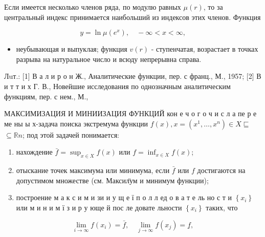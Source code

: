 \documentclass[10pt]{article}
\begin{document}
Если имеется несколько членов ряда, по модулю равных $\mu(r)$, то за центральный индекс принимается наибольший из индексов этих членов. Функция



\[

y=\ln \mu\left(e^{x}\right), \quad-\infty<x<\infty,

\]



\begin{itemize}

  \item неубывающая и выпуклая; функция $v(r)$ - ступенчатая, возрастает в точках разрыва на натуральное число и всюду непрерывна справа.

\end{itemize}



Лuт.: [1] В а л и р о н Ж., Аналитические функции, пер. с франц., М., 1957; [2] В и т т и х Г. В., Новейшие исследования по однозначным аналитическим функциям, пер. с нем., М.,



МАКСИМИЗАЦИЯ И МИНИИЗАЦИЯ ФУНКЦИЙ кон е ч о г о ч и с л а пе р е ме ны ы х-задача поиска экстремума функции $f(x), x=\left(x^{1}, \ldots, x^{n}\right) \in X \sqsubseteq$ $\subseteq \mathbb{R} n$; под этой задачей понимается:



\begin{enumerate}

  \item нахождение $\bar{f}=\sup _{x \in X} f(x)$ или $f=\inf _{x \in X} f(x)$;



  \item отыскание точек максимума или минимума, если $\bar{f}$ или $f$ достигаются на допустимом множестве (см. Максил̈ум и минимум функции);



  \item построение м а к с и м и зи и у щ е ї п о л л ед о в а т е ль но с т и $\left\{x_{i}\right\}$ или м и н и м ї з и р у юще й пос ле довате льности $\left\{x_{i}\right\}$ таких, что



\end{enumerate}



\[

\lim _{i \rightarrow \infty} f\left(x_{i}\right)=\bar{f}, \quad \lim _{j \rightarrow \infty} f\left(x_{j}\right)=\underline{f},

\]
\end{document}
